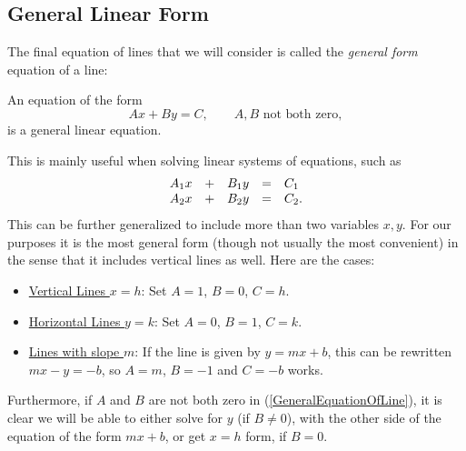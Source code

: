 \subsection{General Linear Form}
The final equation of lines that we will consider is called
the {\it general form} equation of a line:

\begin{definition}An equation of the form
\begin{equation}\label{GeneralEquationOfLine}
Ax+By=C,\qquad A,B\text{ not both zero},\end{equation}
is a {\rm general linear equation}.\end{definition}
This is mainly useful when solving linear systems of equations, 
such as
$$\begin{array}{ccccc}
A_1x&+&B_1y&=&C_1\hphantom{.}\\
A_2x&+&B_2y&=&C_2.\end{array}$$
This can be further generalized to include more than two variables
$x,y$.
For our purposes it is the most general form (though not usually the
most convenient) in the sense that it includes
vertical lines as well. Here are the cases:
\begin{itemize}
\item \underline{Vertical \vphantom{p}Lines $x=h$}: Set $A=1$, $B=0$, $C=h$.
\item \underline{Horizontal \vphantom{p}Lines $y=k$}: Set $A=0$, $B=1$, $C=k$.
\item \underline{Lines with slope $m$}: If the line is given by
$y=mx+b$, this can be rewritten $mx-y=-b$, so $A=m$, $B=-1$ and $C=-b$
works.
\end{itemize}
Furthermore, if $A$ and $B$ are not both zero in
(\ref{GeneralEquationOfLine}), it is clear
we will be able to either solve for $y$ (if $B\ne0$), with
the other side of the equation of the form $mx+b$, 
or get $x=h$ form, if $B=0$.

